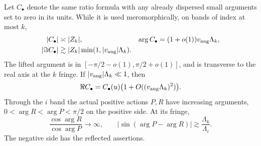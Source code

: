 \begin{lemma}
Let $C_\bullet$ denote the same ratio formula with any already
dispersed small arguments set to zero in its units. While it is used
meromorphically, on bands of index at most $k$,
\begin{align}
 |C_\bullet|&\asymp |Z_k|,&
 \arg C_\bullet&=(1+o(1))v_{\rm ang}\Lambda_k,\label{eq:mixed-ratio-angle}\\
 |\Im C_\bullet|&\gtrsim |Z_k|\min(1,|v_{\rm ang}|\Lambda_k).&&\label{eq:mixed-ratio-im}
\end{align}
The lifted argument is in $[-\pi/2-o(1),\pi/2+o(1)]$, and is
transverse to the real axis at the $k$ fringe. If
$|v_{\rm ang}|\Lambda_k\ll1$, then
\begin{equation}\label{eq:mixed-real-shift}
 \Re C_\bullet=C_\bullet(u)
             \bigl(1+O((v_{\rm ang}\Lambda_k)^2)\bigr).
\end{equation}
Through the $i$ band the actual positive actions $P,R$ have increasing
arguments, $0<\arg R<\arg P<\pi/2$ on the positive side. At its fringe,
\begin{equation}\label{eq:mixed-cos-gap}
 \frac{\cos\arg R}{\cos\arg P}\longrightarrow\infty,
 \qquad |\sin(\arg P-\arg R)|\gtrsim\frac{\Lambda_k}{\Lambda_i}.
\end{equation}
The negative side has the reflected assertions.
\end{lemma}

